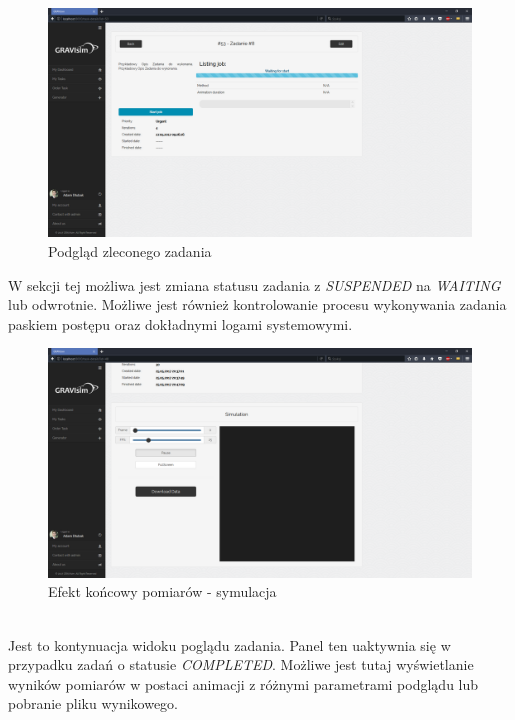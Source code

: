 \documentclass[a4paper,onecolumn,oneside,12pt]{memoir}
\begin{document}
{{\begin{figure}[h!]
	\centering
	\includegraphics[width=0.9\linewidth]{pictures/screen-9}
	\caption{Podgląd zleconego zadania}
\end{figure}
W sekcji tej możliwa jest zmiana statusu zadania z \textit{SUSPENDED} na \textit{WAITING} lub odwrotnie. Możliwe jest również kontrolowanie procesu wykonywania zadania paskiem postępu oraz dokładnymi logami systemowymi.\\
\pagebreak
\vspace*{1mm}
\begin{figure}[h!]
	\centering
	\includegraphics[width=0.9\linewidth]{pictures/screen-8}
	\caption{Efekt końcowy pomiarów - symulacja}
\end{figure}
\\
Jest to kontynuacja widoku poglądu zadania. Panel ten uaktywnia się w przypadku zadań o statusie \textit{COMPLETED}. Możliwe jest tutaj wyświetlanie wyników pomiarów w postaci animacji z różnymi parametrami podglądu lub pobranie pliku wynikowego.\\

}}
\end{document}
